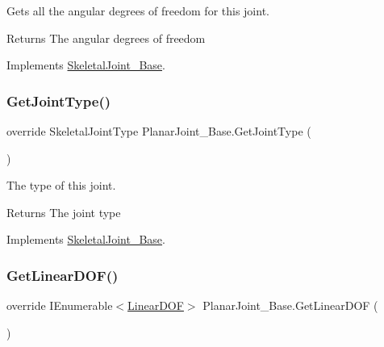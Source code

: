 Gets all the angular degrees of freedom for this joint. 

\begin{DoxyReturn}{Returns}
The angular degrees of freedom
\end{DoxyReturn}


Implements \hyperlink{class_skeletal_joint___base_abf96267052733ccf001e0b092c6582f8}{Skeletal\+Joint\+\_\+\+Base}.

\mbox{\label{class_planar_joint___base_ab4646593b8f3d4b0ef7ddd86e783405e}} 
\subsubsection{\texorpdfstring{Get\+Joint\+Type()}{GetJointType()}}
{\footnotesize\ttfamily override Skeletal\+Joint\+Type Planar\+Joint\+\_\+\+Base.\+Get\+Joint\+Type (\begin{DoxyParamCaption}{ }\end{DoxyParamCaption})\hspace{0.3cm}{\ttfamily [virtual]}}



The type of this joint. 

\begin{DoxyReturn}{Returns}
The joint type
\end{DoxyReturn}


Implements \hyperlink{class_skeletal_joint___base_aee155cbd483cb512bf3fc0f9a8885335}{Skeletal\+Joint\+\_\+\+Base}.

\mbox{\label{class_planar_joint___base_a50dcc45fbe13093f40b7eeef117e8f16}} 
\subsubsection{\texorpdfstring{Get\+Linear\+D\+O\+F()}{GetLinearDOF()}}
{\footnotesize\ttfamily override I\+Enumerable$<$\hyperlink{interface_linear_d_o_f}{Linear\+D\+OF}$>$ Planar\+Joint\+\_\+\+Base.\+Get\+Linear\+D\+OF (\begin{DoxyParamCaption}{ }\end{DoxyParamCaption})\hspace{0.3cm}{\ttfamily [virtual]}}




